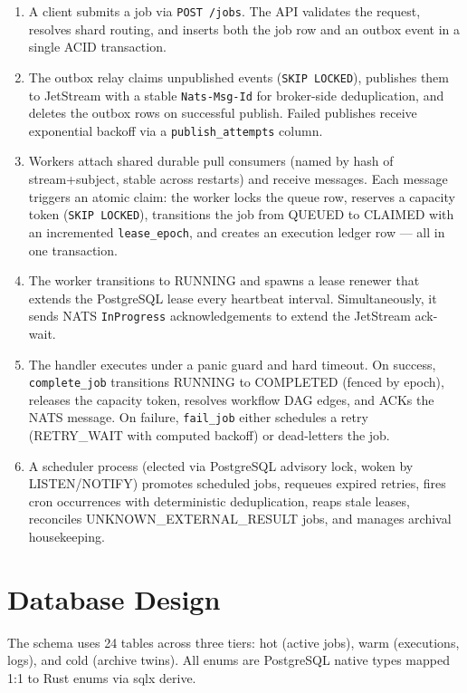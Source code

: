 \documentclass[11pt,a4paper]{article}
\begin{document}
\begin{enumerate}
\item A client submits a job via \texttt{POST /jobs}. The API validates the
request, resolves shard routing, and inserts both the job row and an outbox
event in a single ACID transaction.
\item The outbox relay claims unpublished events (\texttt{SKIP LOCKED}),
publishes them to JetStream with a stable \texttt{Nats-Msg-Id} for
broker-side deduplication, and deletes the outbox rows on successful publish.
Failed publishes receive exponential backoff via a \texttt{publish\_attempts}
column.
\item Workers attach shared durable pull consumers (named by hash of
stream+subject, stable across restarts) and receive messages. Each message
triggers an atomic claim: the worker locks the queue row, reserves a capacity
token (\texttt{SKIP LOCKED}), transitions the job from QUEUED to CLAIMED with
an incremented \texttt{lease\_epoch}, and creates an execution ledger row —
all in one transaction.
\item The worker transitions to RUNNING and spawns a lease renewer that
extends the PostgreSQL lease every heartbeat interval. Simultaneously, it sends
NATS \texttt{InProgress} acknowledgements to extend the JetStream ack-wait.
\item The handler executes under a panic guard and hard timeout. On success,
\texttt{complete\_job} transitions RUNNING to COMPLETED (fenced by epoch),
releases the capacity token, resolves workflow DAG edges, and ACKs the NATS
message. On failure, \texttt{fail\_job} either schedules a retry
(RETRY\_WAIT with computed backoff) or dead-letters the job.
\item A scheduler process (elected via PostgreSQL advisory lock, woken by
LISTEN/NOTIFY) promotes scheduled jobs, requeues expired retries, fires cron
occurrences with deterministic deduplication, reaps stale leases, reconciles
UNKNOWN\_EXTERNAL\_RESULT jobs, and manages archival housekeeping.
\end{enumerate}

\section{Database Design}

The schema uses 24 tables across three tiers: hot (active jobs), warm
(executions, logs), and cold (archive twins). All enums are PostgreSQL native
types mapped 1:1 to Rust enums via sqlx derive.
\end{document}
